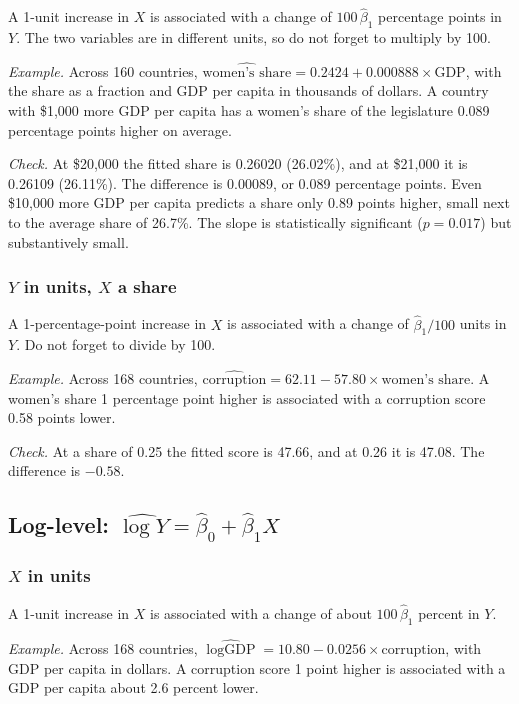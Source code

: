 \documentclass[11pt]{article}
\begin{document}
A 1-unit increase in $X$ is associated with a change of $100\,\hat\beta_1$ percentage points in
$Y$. The two variables are in different units, so do not forget to multiply by 100.

\emph{Example.} Across 160 countries, $\widehat{\text{women's share}} = 0.2424 + 0.000888\times\text{GDP}$,
with the share as a fraction and GDP per capita in thousands of dollars. A country with \$1,000 more
GDP per capita has a women's share of the legislature 0.089 percentage points higher on average.

\emph{Check.} At \$20,000 the fitted share is 0.26020 (26.02\%), and at \$21,000 it is 0.26109
(26.11\%). The difference is 0.00089, or 0.089 percentage points. Even \$10,000 more GDP per
capita predicts a share only 0.89 points higher, small next to the average share of 26.7\%. The
slope is statistically significant ($p = 0.017$) but substantively small.

\subsubsection*{$Y$ in units, $X$ a share}

A 1-percentage-point increase in $X$ is associated with a change of $\hat\beta_1/100$ units in $Y$.
Do not forget to divide by 100.

\emph{Example.} Across 168 countries, $\widehat{\text{corruption}} = 62.11 - 57.80\times\text{women's
share}$. A women's share 1 percentage point higher is associated with a corruption score 0.58 points
lower.

\emph{Check.} At a share of 0.25 the fitted score is 47.66, and at 0.26 it is 47.08. The difference is
$-0.58$.

\subsection{\texorpdfstring{Log-level: $\widehat{\log Y}=\hat{\beta}_0 + \hat{\beta}_1 X$}{Log-level}}

\subsubsection*{$X$ in units}

A 1-unit increase in $X$ is associated with a change of about $100\,\hat\beta_1$ percent in $Y$.

\emph{Example.} Across 168 countries, $\widehat{\log \text{GDP}} = 10.80 - 0.0256\times\text{corruption}$,
with GDP per capita in dollars. A corruption score 1 point higher is associated with a GDP per capita
about 2.6 percent lower.
\end{document}
